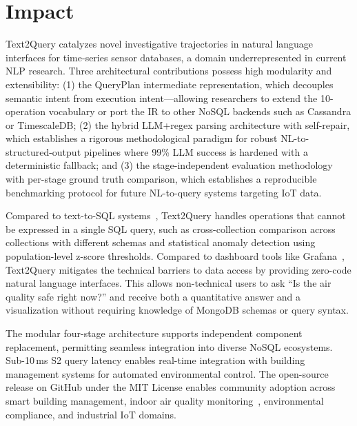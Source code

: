 \documentclass[preprint,12pt,a4paper]{elsarticle}
\begin{document}
\section{Impact}

Text2Query catalyzes novel investigative trajectories in natural language interfaces for time-series sensor databases, a domain underrepresented in current NLP research. Three architectural contributions possess high modularity and extensibility: (1) the QueryPlan intermediate representation, which decouples semantic intent from execution intent---allowing researchers to extend the 10-operation vocabulary or port the IR to other NoSQL backends such as Cassandra or TimescaleDB; (2) the hybrid LLM+regex parsing architecture with self-repair, which establishes a rigorous methodological paradigm for robust NL-to-structured-output pipelines where 99\% LLM success is hardened with a deterministic fallback; and (3) the stage-independent evaluation methodology with per-stage ground truth comparison, which establishes a reproducible benchmarking protocol for future NL-to-query systems targeting IoT data.

Compared to text-to-SQL systems~\cite{yu2018spider,pourreza2024dinsql}, Text2Query handles operations that cannot be expressed in a single SQL query, such as cross-collection comparison across collections with different schemas and statistical anomaly detection using population-level z-score thresholds. Compared to dashboard tools like Grafana~\cite{grafana}, Text2Query mitigates the technical barriers to data access by providing zero-code natural language interfaces. This allows non-technical users to ask ``Is the air quality safe right now?'' and receive both a quantitative answer and a visualization without requiring knowledge of MongoDB schemas or query syntax.

The modular four-stage architecture supports independent component replacement, permitting seamless integration into diverse NoSQL ecosystems. Sub-10\,ms S2 query latency enables real-time integration with building management systems for automated environmental control. The open-source release on GitHub under the MIT License enables community adoption across smart building management, indoor air quality monitoring~\cite{who2010iaq}, environmental compliance, and industrial IoT domains.

\end{document}
